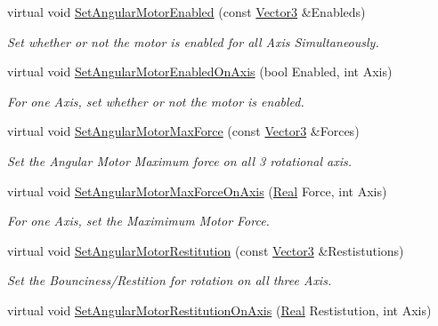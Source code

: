 \begin{DoxyCompactItemize}
virtual void \hyperlink{classMezzanine_1_1Generic6DofConstraint_a9543fd9a15f9be95fafe812c90f566d8}{SetAngularMotorEnabled} (const \hyperlink{classMezzanine_1_1Vector3}{Vector3} \&Enableds)
\begin{DoxyCompactList}\small\item\em Set whether or not the motor is enabled for all Axis Simultaneously. \item\end{DoxyCompactList}\item 
virtual void \hyperlink{classMezzanine_1_1Generic6DofConstraint_af487eb94c231601a2cb3dd3e813f1024}{SetAngularMotorEnabledOnAxis} (bool Enabled, int Axis)
\begin{DoxyCompactList}\small\item\em For one Axis, set whether or not the motor is enabled. \item\end{DoxyCompactList}\item 
virtual void \hyperlink{classMezzanine_1_1Generic6DofConstraint_ada0b7be3499cb3da27ca36e0076323c7}{SetAngularMotorMaxForce} (const \hyperlink{classMezzanine_1_1Vector3}{Vector3} \&Forces)
\begin{DoxyCompactList}\small\item\em Set the Angular Motor Maximum force on all 3 rotational axis. \item\end{DoxyCompactList}\item 
virtual void \hyperlink{classMezzanine_1_1Generic6DofConstraint_ae4909e7a8782698049a06036b1a044c2}{SetAngularMotorMaxForceOnAxis} (\hyperlink{namespaceMezzanine_a726731b1a7df72bf3583e4a97282c6f6}{Real} Force, int Axis)
\begin{DoxyCompactList}\small\item\em For one Axis, set the Maximimum Motor Force. \item\end{DoxyCompactList}\item 
virtual void \hyperlink{classMezzanine_1_1Generic6DofConstraint_adbd65a2c6facda66b4736baa24fd12ed}{SetAngularMotorRestitution} (const \hyperlink{classMezzanine_1_1Vector3}{Vector3} \&Restistutions)
\begin{DoxyCompactList}\small\item\em Set the Bounciness/Restition for rotation on all three Axis. \item\end{DoxyCompactList}\item 
virtual void \hyperlink{classMezzanine_1_1Generic6DofConstraint_a64b2f088046feedbedbc6277dc6bbe1b}{SetAngularMotorRestitutionOnAxis} (\hyperlink{namespaceMezzanine_a726731b1a7df72bf3583e4a97282c6f6}{Real} Restistution, int Axis)

\end{DoxyCompactItemize}

